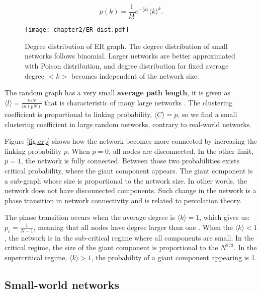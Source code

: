 
\begin{equation}
p(k) = \frac{1}{k!}e^{-\langle k \rangle}\langle k \rangle^{k}.
\end{equation}

\begin{figure}[H]
	\centering
	\texttt{[image: chapter2/ER\_dist.pdf]}
	\caption[Degree distribution of Erdős-R\' {e}nyi graph.]{Degree distribution of ER graph. The degree distribution of small networks follows binomial. Larger networks are better approximated with Poison distribution, and degree distribution for fixed average degree $<k>$ becomes independent of the network size.}
	\label{fig:erdist}
\end{figure}

The random graph has a very small \textbf{average path length}, it is given as $\langle l \rangle = \frac{ln N}{ln(pN)}$ that is characteristic of many large networks \cite{bollobas2003mathematical}. The clustering coefficient is proportional to linking probability, $\langle C \rangle = p$, so we find a small clustering coefficient in large random networks, contrary to real-world networks.  %

Figure \ref{fig:erp} shows how the network becomes more connected by increasing the linking probability $p$. When $p=0$, all nodes are disconnected. In the other limit, $p=1$, the network is fully connected. Between those two probabilities exists critical probability, where the giant component appears. The giant component is a sub-graph whose size is proportional to the network size. In other words, the network does not have disconnected components. Such change in the network is a phase transition in network connectivity and is related to percolation theory. 

The phase transition occurs when the average degree is $ \langle k  \rangle = 1$, which gives us: $p_c = \frac{1}{N-1}$, meaning that all nodes have degree larger than one \cite{barabasi2016network}. When the $ \langle k  \rangle < 1$, the network is in the sub-critical regime where all components are small. In the critical regime, the size of the giant component is proportional to the $N^{2/3}$. In the supercritical regime, $ \langle k  \rangle > 1$, the probability of a giant component appearing is 1.

\subsection{Small-world networks}

